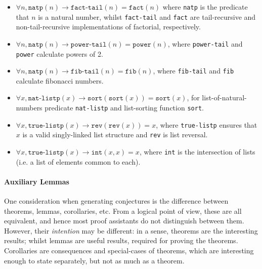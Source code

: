 \begin{itemize}

  \item $\forall n, \texttt{natp}(n) \rightarrow \texttt{fact-tail}(n) = \texttt{fact}(n)$ where \texttt{natp} is the predicate that $n$ is a natural number, whilst \texttt{fact-tail} and \texttt{fact} are tail-recursive and non-tail-recursive implementations of factorial, respectively.

  \item $\forall n, \texttt{natp}(n) \rightarrow \texttt{power-tail}(n) = \texttt{power}(n)$,  where \texttt{power-tail} and \texttt{power} calculate powers of 2.

  \item $\forall n, \texttt{natp}(n) \rightarrow \texttt{fib-tail}(n) = \texttt{fib}(n)$,  where \texttt{fib-tail} and \texttt{fib} calculate fibonacci numbers.

  \item $\forall x, \texttt{nat-listp}(x) \rightarrow \texttt{sort}(\texttt{sort}(x)) = \texttt{sort}(x)$, for list-of-natural-numbers predicate \texttt{nat-listp} and list-sorting function \texttt{sort}.

  \item $\forall x, \texttt{true-listp}(x) \rightarrow \texttt{rev}(\texttt{rev}(x)) = x$, where \texttt{true-listp} ensures that $x$ is a valid singly-linked list structure and \texttt{rev} is list reversal.

  \item $\forall x, \texttt{true-listp}(x) \rightarrow \texttt{int}(x, x) = x$, where \texttt{int} is the intersection of lists (i.e. a list of elements common to each).

\end{itemize}

\paragraph{Auxiliary Lemmas} \label{sec:auxiliarylemmas}

One consideration when generating conjectures is the difference between
theorems, lemmas, corollaries, etc. From a logical point of view, these are all
equivalent, and hence most proof assistants do not distinguish between
them. However, their \emph{intention} may be different: in a sense, theorems are
the interesting results; whilst lemmas are useful results, required for proving
the theorems. Corollaries are consequences and special-cases of theorems, which
are interesting enough to state separately, but not as much as a theorem.

